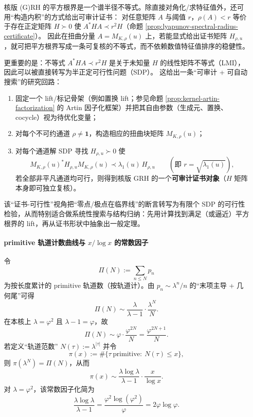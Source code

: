 \begin{remark}\label{rem:finite-rh-lyapunov}
核版 (G)RH 的平方根界是一个谱半径不等式。除直接对角化/求特征值外，还可用“构造内积”的方式给出可审计证书：
对任意矩阵 $A$ 与阈值 $r$，$\rho(A)<r$ 等价于存在正定矩阵 $H\succ 0$ 使 $A^\ast H A\prec r^2 H$（命题 \ref{prop:lyapunov-spectral-radius-certificate}）。
因此在扭曲分量 $A=M_{K,\rho}(u)$ 上，若能显式给出证书矩阵 $H_{\rho,u}$，就可把平方根界写成一条可复核的不等式，而不依赖数值特征值排序的稳健性。
\par
更重要的是：不等式
\(
A^\ast H A\prec r^2 H
\)
是关于未知量 \(H\) 的线性矩阵不等式（LMI），因此可以被直接转写为半正定可行性问题（SDP）。
这给出一条“可审计 + 可自动搜索”的研究回路：
\begin{enumerate}
  \item 固定一个 lift/标记骨架（例如置换 lift；参见命题 \ref{prop:kernel-artin-factorization} 的 Artin 因子化框架）并把其自由参数（生成元、置换、cocycle）视为待优化变量；
  \item 对每个不可约通道 \(\rho\neq\mathbf{1}\)，构造相应的扭曲块矩阵 \(M_{K,\rho}(u)\)；
  \item 对每个通道解 SDP 寻找 \(H_{\rho,u}\succ 0\) 使
  \[
  M_{K,\rho}(u)^\ast H_{\rho,u} M_{K,\rho}(u)\prec \lambda_1(u)\,H_{\rho,u}
  \qquad(\text{即 }r=\sqrt{\lambda_1(u)}),
  \]
  若全部非平凡通道均可行，则得到核版 GRH 的一个\textbf{可审计证书对象}（\(H\) 矩阵本身即可独立复核）。
\end{enumerate}
该“证书-可行性”视角把“零点/极点在临界线”的断言转写为有限个 SDP 的可行性检验，从而特别适合做系统性搜索与结构归纳：先用计算找到满足（或逼近）平方根界的 lift，再从证书形状中抽象出一般定理。
\end{remark}

\paragraph{primitive 轨道计数曲线与 \texorpdfstring{$x/\log x$}{x/log x} 的常数因子}\label{par:finite-rh-primitive-xlogx}
令
\[
\Pi(N):=\sum_{n\le N}p_n
\]
为按长度累计的 primitive 轨道数（按轨道计）。由 $p_n\sim \lambda^n/n$ 的“末项主导 + 几何尾”可得
\[
\Pi(N)\sim \frac{\lambda}{\lambda-1}\cdot \frac{\lambda^N}{N}.
\]
在本核上 $\lambda=\varphi^2$ 且 $\lambda-1=\varphi$，故
\[
\Pi(N)\sim \varphi\cdot\frac{\varphi^{2N}}{N}=\frac{\varphi^{2N+1}}{N}.
\]
若定义“轨道范数” $N(\tau):=\lambda^{|\tau|}$ 并令
\[
\pi(x):=\#\{\tau\ \mathrm{primitive}:\ N(\tau)\le x\},
\]
则 $\pi(\lambda^N)=\Pi(N)$，从而
\[
\pi(x)\sim \frac{\lambda\log\lambda}{\lambda-1}\cdot \frac{x}{\log x}.
\]
对 $\lambda=\varphi^2$，该常数因子化简为
\[
\frac{\lambda\log\lambda}{\lambda-1}
=\frac{\varphi^2\log(\varphi^2)}{\varphi}
=2\varphi\log\varphi.
\]

